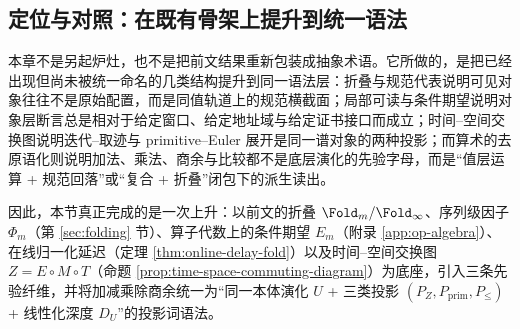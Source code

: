 \subsection{定位与对照：在既有骨架上提升到统一语法}\label{subsec:pom-position}
本章不是另起炉灶，也不是把前文结果重新包装成抽象术语。它所做的，是把已经出现但尚未被统一命名的几类结构提升到同一语法层：折叠与规范代表说明可见对象往往不是原始配置，而是同值轨道上的规范横截面；局部可读与条件期望说明对象层断言总是相对于给定窗口、给定地址域与给定证书接口而成立；时间--空间交换图说明迭代--取迹与 primitive--Euler 展开是同一谱对象的两种投影；而算术的去原语化则说明加法、乘法、商余与比较都不是底层演化的先验字母，而是“值层运算 + 规范回落”或“复合 + 折叠”闭包下的派生读出。

因此，本节真正完成的是一次上升：以前文的折叠 $\Fold_m/\Fold_\infty$、序列级因子 $\Phi_m$（第 \ref{sec:folding} 节）、算子代数上的条件期望 $E_m$（附录 \ref{app:op-algebra}）、在线归一化延迟（定理 \ref{thm:online-delay-fold}）以及时间--空间交换图 $Z=E\circ M\circ T$（命题 \ref{prop:time-space-commuting-diagram}）为底座，引入三条先验纤维，并将加减乘除商余统一为“同一本体演化 \(U\) + 三类投影 \((P_Z,P_{\mathrm{prim}},P_{\le})\) + 线性化深度 \(D_U\)”的投影词语法。

